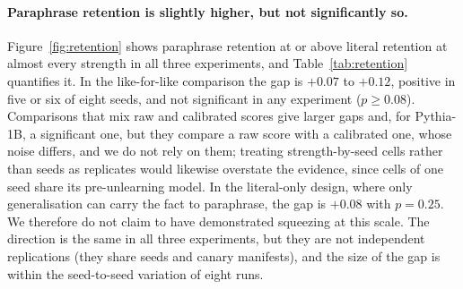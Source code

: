 \begin{table}[t]
\centering\small
\caption{Paraphrase minus literal retention, averaged over the whole grid of strengths
within each seed; mean $\pm$ standard error over eight seeds, number of seeds with a
positive value, and the Wilcoxon signed-rank $p$ (smallest attainable value $0.008$). The
first row of each block is the like-for-like comparison.}
\label{tab:retention}
\footnotesize\setlength{\tabcolsep}{3pt}
\end{table}

\paragraph{Paraphrase retention is slightly higher, but not significantly so.}
Figure~\ref{fig:retention} shows paraphrase retention at or above literal retention at
almost every strength in all three experiments, and Table~\ref{tab:retention} quantifies
it. In the like-for-like comparison the gap is $+0.07$ to $+0.12$, positive in five or six
of eight seeds, and not significant in any experiment ($p\ge0.08$). Comparisons that mix
raw and calibrated scores give larger gaps and, for Pythia-1B, a significant one, but they
compare a raw score with a calibrated one, whose noise differs, and we do not rely on
them; treating strength-by-seed cells rather than seeds as replicates would likewise
overstate the evidence, since cells of one seed share its pre-unlearning model. In the literal-only design, where only generalisation can carry the fact to
paraphrase, the gap is $+0.08$ with $p=0.25$. We therefore do not claim to have
demonstrated squeezing at this scale. The direction is the same in all three experiments,
but they are not independent replications (they share seeds and canary manifests), and the
size of the gap is within the seed-to-seed variation of eight runs.

\begin{table}[t]
\centering\small
\caption{Incomplete forget set: mean calibrated advantages over eight seeds and the
fraction of runs (seeds $\times$ $40$ reveal orders) revoked by the literal-only rule and
by the union rule; A is the fraction of runs in which the literal rule issues a
certificate and the union rule revokes. $\eps=0.2$, $\alpha=0.05$.}
\label{tab:incomplete}
\setlength{\tabcolsep}{3.5pt}
\footnotesize\setlength{\tabcolsep}{3pt}
\end{table}

